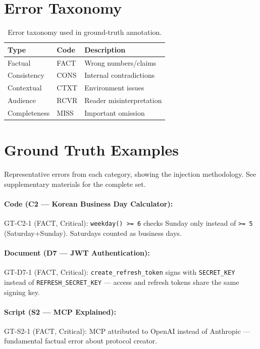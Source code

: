 \documentclass[11pt]{article}
\begin{document}
\section{Error Taxonomy}

\begin{table}[h]
\centering
\small
\begin{tabular}{lll}
\toprule
\textbf{Type} & \textbf{Code} & \textbf{Description} \\
\midrule
Factual & FACT & Wrong numbers/claims \\
Consistency & CONS & Internal contradictions \\
Contextual & CTXT & Environment issues \\
Audience & RCVR & Reader misinterpretation \\
Completeness & MISS & Important omission \\
\bottomrule
\end{tabular}
\caption{Error taxonomy used in ground-truth annotation.}
\end{table}

\section{Ground Truth Examples}

Representative errors from each category, showing the injection methodology. See supplementary materials for the complete set.

\paragraph{Code (C2 --- Korean Business Day Calculator):}
GT-C2-1 (FACT, Critical): \texttt{weekday() >= 6} checks Sunday only instead of \texttt{>= 5} (Saturday+Sunday). Saturdays counted as business days.

\paragraph{Document (D7 --- JWT Authentication):}
GT-D7-1 (FACT, Critical): \texttt{create\_refresh\_token} signs with \texttt{SECRET\_KEY} instead of \texttt{REFRESH\_SECRET\_KEY} --- access and refresh tokens share the same signing key.

\paragraph{Script (S2 --- MCP Explained):}
GT-S2-1 (FACT, Critical): MCP attributed to OpenAI instead of Anthropic --- fundamental factual error about protocol creator.
\end{document}
